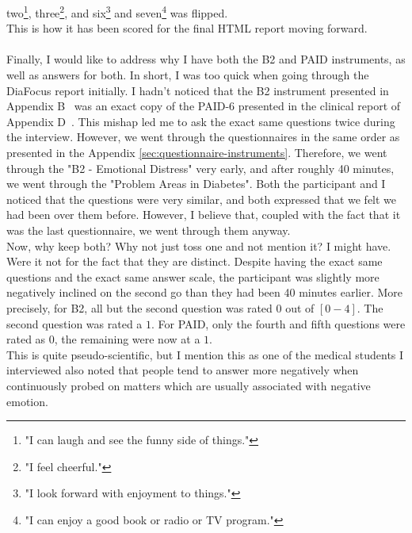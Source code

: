 two\footnote{"I can laugh and see the funny side of things."}, three\footnote{"I feel cheerful."}, and six\footnote{"I look forward with enjoyment to things."} and seven\footnote{"I can enjoy a good book or radio or TV program."} was flipped.
\\
This is how it has been scored for the final HTML report moving forward.
\\
\\
Finally, I would like to address why I have both the B2 and PAID instruments, as well as answers for both. In short, I was too quick when going through the DiaFocus report initially. I hadn't noticed that the B2 instrument presented in Appendix B~\cite{DiaFocus} was an exact copy of the PAID-6 presented in the clinical report of Appendix D~\cite{DiaFocus}. This mishap led me to ask the exact same questions twice during the interview. However, we went through the questionnaires in the same order as presented in the Appendix \autoref{sec:questionnaire-instruments}. Therefore, we went through the "B2 - Emotional Distress" very early, and after roughly 40 minutes, we went through the "Problem Areas in Diabetes". Both the participant and I noticed that the questions were very similar, and both expressed that we felt we had been over them before. However, I believe that, coupled with the fact that it was the last questionnaire, we went through them anyway.
\\
Now, why keep both? Why not just toss one and not mention it? I might have. Were it not for the fact that they are distinct. Despite having the exact same questions and the exact same answer scale, the participant was slightly more negatively inclined on the second go than they had been 40 minutes earlier. More precisely, for B2, all but the second question was rated $0$ out of $[0-4]$. The second question was rated a $1$. For PAID, only the fourth and fifth questions were rated as $0$, the remaining were now at a $1$.
\\
This is quite pseudo-scientific, but I mention this as one of the medical students I interviewed also noted that people tend to answer more negatively when continuously probed on matters which are usually associated with negative emotion.

